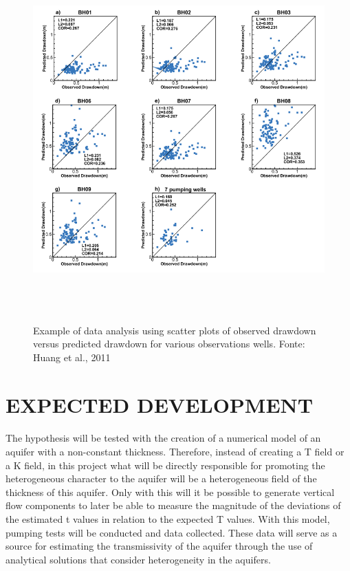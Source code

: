 \documentclass[11pt, a4paper]{article}
\begin{document}
    \begin{figure}[h]
        \centering
        \captionsetup{justification=centering}
        \includegraphics[height=5.5in]{huang-et-al.png}
        \caption{Example of data analysis using scatter plots of observed drawdown versus predicted drawdown for various observations wells. Fonte: Huang et al., 2011}
        \label{fig:huang}
    \end{figure}
    
    
    \section{EXPECTED DEVELOPMENT} \label{sec:desen}
    \paragraph{} %
    The hypothesis will be tested with the creation of a numerical model of an aquifer with a non-constant thickness. Therefore, instead of creating a T field or a K field, in this project what will be directly responsible for promoting the heterogeneous character to the aquifer will be a heterogeneous field of the thickness of this aquifer. Only with this will it be possible to generate vertical flow components to later be able to measure the magnitude of the deviations of the estimated t values in relation to the expected T values. With this model, pumping tests will be conducted and data collected. These data will serve as a source for estimating the transmissivity of the aquifer through the use of analytical solutions that consider heterogeneity in the aquifers.
\end{document}
